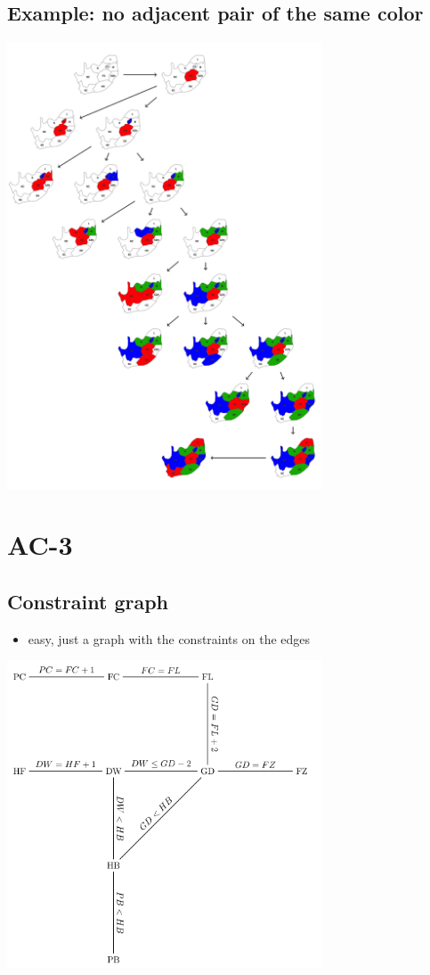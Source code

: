 \documentclass[conference]{styles/acmsiggraph}
\begin{document}
\subsection{Example: no adjacent pair of the same color}
\includegraphics[width=0.7\textwidth]{imgs/naive.png}

\section{AC-3}

\subsection{Constraint graph}

\begin{itemize}
    \item easy, just a graph with the constraints on the edges
\end{itemize}

\includegraphics[width=0.7\textwidth]{imgs/constraint.png}
\end{document}
